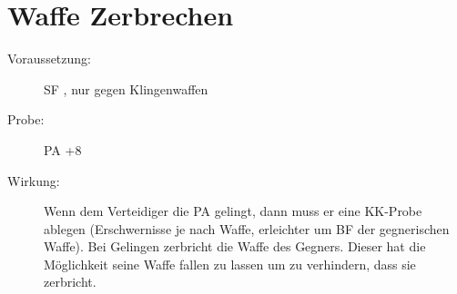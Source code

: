 \section{Waffe Zerbrechen}
\label{reaktion.waffe_zerbrechen}
\begin{description}
    \item[Voraussetzung:]
        SF , nur gegen Klingenwaffen
    \item[Probe:]
        PA +8
    \item[Wirkung:]
        Wenn dem Verteidiger die PA gelingt, dann muss er eine KK-Probe ablegen (Erschwernisse je nach Waffe, erleichter um BF der gegnerischen Waffe).
        Bei Gelingen zerbricht die Waffe des Gegners.
        Dieser hat die Möglichkeit seine Waffe fallen zu lassen um zu verhindern, dass sie zerbricht.
\end{description}
